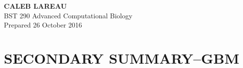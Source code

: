 \documentclass[12pt]{article}
\begin{document}
\begin{minipage}[t]{0.5\linewidth}
    \begin{flushleft}
    \textbf{
    {\huge C}{\Large ALEB} \hspace{-0.1em} 
    {\huge L}{\Large AREAU}}\\
     \hspace*{4mm} BST 290 Advanced Computational Biology \\
     \hspace*{4mm} Prepared 26 October 2016
         \end{flushleft}
\end{minipage}

 
 
\section*{\textbf{{\Large S}{\small ECONDARY} {\Large S}{\small UMMARY}{\Large --G}{\small BM}}}
\end{document}
